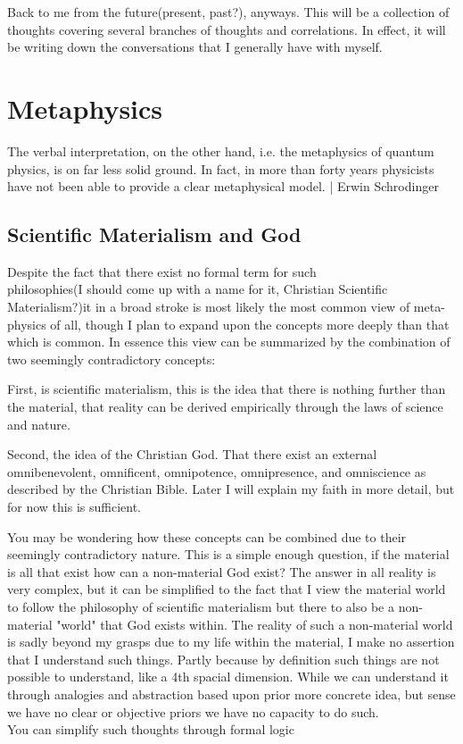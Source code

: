 \par Back to me from the future(present, past?), anyways. This will be a collection of thoughts covering several branches of thoughts and correlations. In effect, it will be writing down the conversations that I generally have with myself.


\chapter{Metaphysics}
The verbal interpretation, on the other hand, i.e. the metaphysics of quantum physics, is on far less solid ground. In fact, in more than forty years physicists have not been able to provide a clear metaphysical model. | Erwin Schrodinger 
\section{Scientific Materialism and God}

\par Despite the fact that there exist no 
formal term for such \\
philosophies(I should come up with a name for it, Christian Scientific Materialism?)it in a broad stroke is most likely the most common view of meta-physics of all, though I plan to expand upon the concepts more deeply than that which is common. In essence this view can be summarized by the combination of two seemingly contradictory concepts:

\par    First, is scientific materialism, this is the idea that there is nothing further than the material, that reality can be derived empirically through the laws of science and nature.

\par    Second, the idea of the Christian God. That there exist an external omnibenevolent, omnificent, omnipotence, omnipresence, and omniscience as described by the Christian Bible. Later I will explain my faith in more detail, but for now this is sufficient.

\par You may be wondering how these concepts can be combined due to their seemingly contradictory nature. This is a simple enough question, if the material is all that exist how can a non-material God exist? The answer in all reality is very complex, but it can be simplified to the fact that I view the material world to follow the philosophy of scientific materialism but there to also be a non-material "world" that God exists within. The reality of such a non-material world is sadly beyond my grasps due to my life within the material, I make no assertion that I understand such things. Partly because by definition such things are not possible to understand, like a 4th spacial dimension. While we can understand it through analogies and abstraction based upon prior more concrete idea, but sense we have no clear or objective priors we have no capacity to do such. \\
You can simplify such thoughts through formal logic \\

